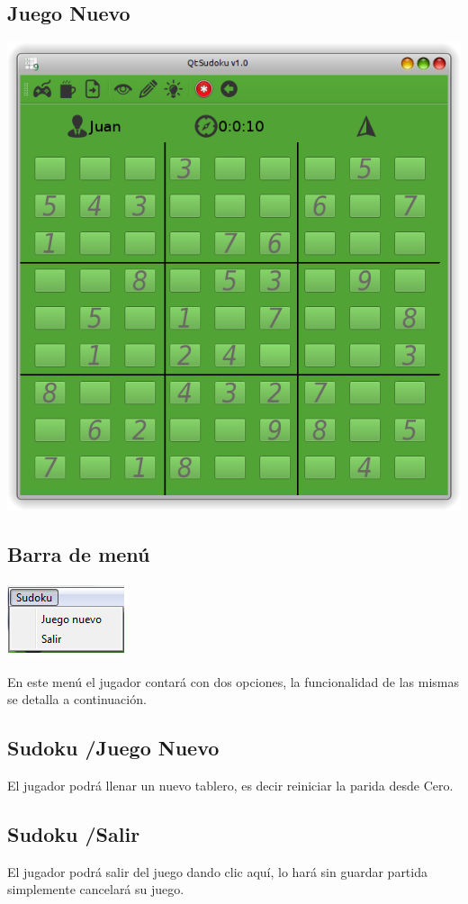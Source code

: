 \documentclass[a4paper,11pt]{article}
\begin{document}
\subsection{Juego Nuevo}
\includegraphics{Tablero.png}
\subsection{Barra de menú}
\includegraphics{barra.png}

En este menú el jugador contará con dos opciones, la funcionalidad de las mismas se detalla a continuación.
\subsection{Sudoku /Juego Nuevo}
El jugador podrá llenar un nuevo tablero, es decir reiniciar la parida desde Cero.
\subsection{Sudoku /Salir}
El jugador podrá salir del juego dando clic aquí, lo hará sin guardar partida simplemente cancelará su juego.
\end{document}
